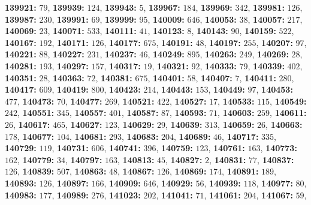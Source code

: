 \textsf{\bfseries 139921:} $79$, \textsf{\bfseries 139939:} $124$, \textsf{\bfseries 139943:} $5$, \textsf{\bfseries 139967:} $184$, \textsf{\bfseries 139969:} $342$, \textsf{\bfseries 139981:} $126$, \textsf{\bfseries 139987:} $230$, \textsf{\bfseries 139991:} $69$, \textsf{\bfseries 139999:} $95$, \textsf{\bfseries 140009:} $646$, \textsf{\bfseries 140053:} $38$, \textsf{\bfseries 140057:} $217$, \textsf{\bfseries 140069:} $23$, \textsf{\bfseries 140071:} $533$, \textsf{\bfseries 140111:} $41$, \textsf{\bfseries 140123:} $8$, \textsf{\bfseries 140143:} $90$, \textsf{\bfseries 140159:} $522$, \textsf{\bfseries 140167:} $192$, \textsf{\bfseries 140171:} $126$, \textsf{\bfseries 140177:} $675$, \textsf{\bfseries 140191:} $48$, \textsf{\bfseries 140197:} $255$, \textsf{\bfseries 140207:} $97$, \textsf{\bfseries 140221:} $88$, \textsf{\bfseries 140227:} $231$, \textsf{\bfseries 140237:} $46$, \textsf{\bfseries 140249:} $895$, \textsf{\bfseries 140263:} $249$, \textsf{\bfseries 140269:} $28$, \textsf{\bfseries 140281:} $193$, \textsf{\bfseries 140297:} $157$, \textsf{\bfseries 140317:} $19$, \textsf{\bfseries 140321:} $92$, \textsf{\bfseries 140333:} $79$, \textsf{\bfseries 140339:} $402$, \textsf{\bfseries 140351:} $28$, \textsf{\bfseries 140363:} $72$, \textsf{\bfseries 140381:} $675$, \textsf{\bfseries 140401:} $58$, \textsf{\bfseries 140407:} $7$, \textsf{\bfseries 140411:} $280$, \textsf{\bfseries 140417:} $609$, \textsf{\bfseries 140419:} $800$, \textsf{\bfseries 140423:} $214$, \textsf{\bfseries 140443:} $153$, \textsf{\bfseries 140449:} $97$, \textsf{\bfseries 140453:} $477$, \textsf{\bfseries 140473:} $70$, \textsf{\bfseries 140477:} $269$, \textsf{\bfseries 140521:} $422$, \textsf{\bfseries 140527:} $17$, \textsf{\bfseries 140533:} $115$, \textsf{\bfseries 140549:} $242$, \textsf{\bfseries 140551:} $345$, \textsf{\bfseries 140557:} $401$, \textsf{\bfseries 140587:} $87$, \textsf{\bfseries 140593:} $71$, \textsf{\bfseries 140603:} $259$, \textsf{\bfseries 140611:} $26$, \textsf{\bfseries 140617:} $465$, \textsf{\bfseries 140627:} $123$, \textsf{\bfseries 140629:} $29$, \textsf{\bfseries 140639:} $313$, \textsf{\bfseries 140659:} $26$, \textsf{\bfseries 140663:} $178$, \textsf{\bfseries 140677:} $104$, \textsf{\bfseries 140681:} $293$, \textsf{\bfseries 140683:} $204$, \textsf{\bfseries 140689:} $46$, \textsf{\bfseries 140717:} $335$, \textsf{\bfseries 140729:} $119$, \textsf{\bfseries 140731:} $606$, \textsf{\bfseries 140741:} $396$, \textsf{\bfseries 140759:} $123$, \textsf{\bfseries 140761:} $163$, \textsf{\bfseries 140773:} $162$, \textsf{\bfseries 140779:} $34$, \textsf{\bfseries 140797:} $163$, \textsf{\bfseries 140813:} $45$, \textsf{\bfseries 140827:} $2$, \textsf{\bfseries 140831:} $77$, \textsf{\bfseries 140837:} $126$, \textsf{\bfseries 140839:} $507$, \textsf{\bfseries 140863:} $48$, \textsf{\bfseries 140867:} $126$, \textsf{\bfseries 140869:} $174$, \textsf{\bfseries 140891:} $189$, \textsf{\bfseries 140893:} $126$, \textsf{\bfseries 140897:} $166$, \textsf{\bfseries 140909:} $646$, \textsf{\bfseries 140929:} $56$, \textsf{\bfseries 140939:} $118$, \textsf{\bfseries 140977:} $80$, \textsf{\bfseries 140983:} $177$, \textsf{\bfseries 140989:} $276$, \textsf{\bfseries 141023:} $202$, \textsf{\bfseries 141041:} $71$, \textsf{\bfseries 141061:} $204$, \textsf{\bfseries 141067:} $59$, 
